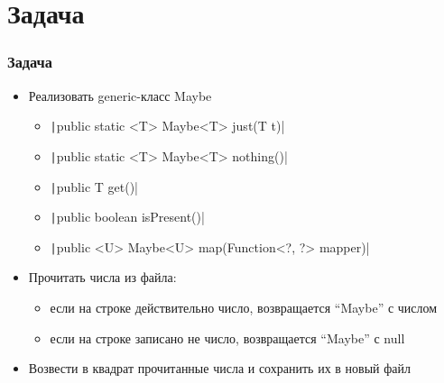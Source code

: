 \documentclass[xetex,mathserif,serif]{beamer}
\begin{document}
	\section{Задача}

	\begin{frame}
		\frametitle{Задача}
		\begin{itemize}
			\item Реализовать generic-класс Maybe
			\begin{itemize}
				\item \texttt|public static <T> Maybe<T> just(T t)|
				\item \texttt|public static <T> Maybe<T> nothing()|
				\item \texttt|public T get()|
				\item \texttt|public boolean isPresent()|
				\item \texttt|public <U> Maybe<U> map(Function<?, ?> mapper)|
			\end{itemize}
			\item Прочитать числа из файла:
			\begin{itemize}
				\item если на строке действительно число, возвращается ``Maybe'' с числом
				\item если на строке записано не число, возвращается ``Maybe'' с null
			\end{itemize}
			\item Возвести в квадрат прочитанные числа и сохранить их в новый файл
		\end{itemize}
	\end{frame}
	
\end{document}
